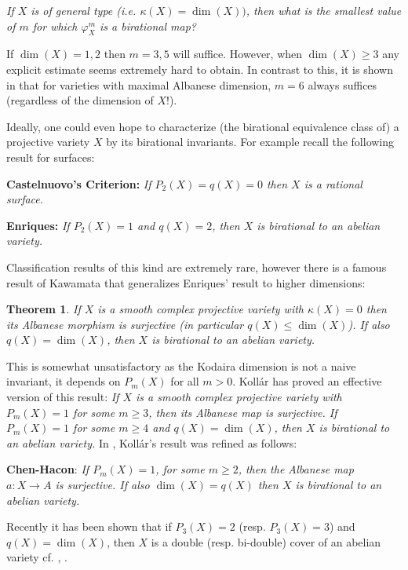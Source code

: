 \documentclass[10pt]{amsart}
\newtheorem{thm}{Theorem}[section]
\newcommand\alb{{ a}}
\newcommand\lra{\longrightarrow}
\newcommand\Alb{{ A}}
\begin{document}
\bigskip {}
{\it If $X$ is of general type (i.e. $\kappa (X)=\dim (X))$, 
then what is the smallest
value of $m$ for which $\varphi^m_X$ is a birational map?}
\bigskip

If $\dim (X)=1,2$ then $m=3,5$ will suffice. However, when $\dim (X)\geq 3$
any explicit estimate seems extremely hard to obtain. 
In contrast to this, it is shown in \cite{CH3} 
that for varieties with maximal Albanese dimension, $m=6$ always 
suffices (regardless of the dimension of $X$!).  




Ideally, one could even hope to characterize (the birational equivalence class
of) a projective variety $X$ by its birational invariants. 
For example recall the following result for surfaces:

\bigskip \noindent 
{\bf Castelnuovo's Criterion:} {\it If $P_2(X)=q(X)=0$ then $X$ is a 
rational surface.}

\bigskip \noindent
{\bf Enriques:} {\it If $P_2(X)=1$ and $q(X)=2$, then $X$ is birational to an 
abelian variety.}

\bigskip
Classification results of this kind are extremely rare, 
however there is a famous 
result of Kawamata that generalizes Enriques' result to higher dimensions:
\begin{thm} \label{KAW} \cite{Ka1}
If $X$ is a smooth complex 
projective variety with $\kappa (X)=0$ then 
its Albanese morphism is surjective (in particular $q(X)\leq \dim (X)$).
If also $q(X)=\dim (X)$, then $X$ is 
birational to an abelian variety.
\end{thm} 
This 
is somewhat unsatisfactory as the Kodaira dimension is
not a naive invariant, it depends on $P_m(X)$ for all $m>0$.
Koll\'ar has proved an effective version of this result: {\em If $X$ is
a smooth complex projective variety with $P_m(X)=1$ for some $m\geq 3$,
then its Albanese map is surjective. If $P_m(X)=1$ for some $m\geq 4$
and $q(X)=\dim (X)$, then $X$ is birational to an abelian variety.}
In \cite{CH1}, Koll\'ar's result was refined as follows:

\bigskip\noindent
{\bf Chen-Hacon}: 
{\it If $P_m(X)=1$, for some $m\geq 2$, then the Albanese map
$\alb :X \lra \Alb$ is surjective. If also $\dim (X)=q(X)$ then 
$X$ is birational to an abelian variety.}
\bigskip

Recently it has been shown that if $P_3(X)=2$ (resp. $P_3(X)=3$) 
and $q(X)=\dim (X)$, then $X$ is a double (resp. bi-double) cover of
an abelian variety cf. \cite{HP1}, \cite{Hac2}.
\end{document}
